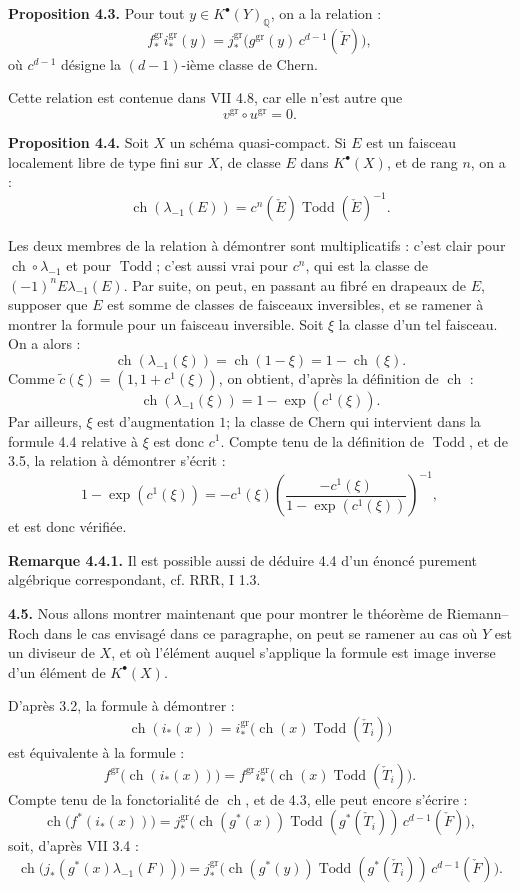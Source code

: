 \documentclass[11pt]{article}
\newcommand{\ch}{\operatorname{ch}}
\newcommand{\Todd}{\operatorname{Todd}}
\newcommand{\RRR}{\mathrm{RRR}}
\providecommand{\ch}{\operatorname{ch}}
\providecommand{\Todd}{\operatorname{Todd}}
\begin{document}
\textbf{Proposition 4.3.} Pour tout \(y\in K^{\bullet}(Y)_{\mathbb Q}\), on a la relation :
\[
 f^{\mathrm{gr}}_* i^{\mathrm{gr}}_*(y)
 =
 j^{\mathrm{gr}}_*\bigl(g^{\mathrm{gr}}(y)\,c^{d-1}(\check F)\bigr),
\]
où \(c^{d-1}\) désigne la \((d-1)\)-ième classe de Chern.

Cette relation est contenue dans VII 4.8, car elle n'est autre que
\[
 v^{\mathrm{gr}}\circ u^{\mathrm{gr}}=0 .
\]

\textbf{Proposition 4.4.} Soit \(X\) un schéma quasi-compact. Si \(E\) est un faisceau localement libre de type fini sur \(X\), de classe \(E\) dans \(K^{\bullet}(X)\), et de rang \(n\), on a :
\[
 \ch(\lambda_{-1}(E))=c^n(\check E)\Todd(\check E)^{-1}.
\]

Les deux membres de la relation à démontrer sont multiplicatifs : c'est clair pour \(\ch\circ\lambda_{-1}\) et pour \(\Todd\); c'est aussi vrai pour \(c^n\), qui est la classe de \((-1)^nE\lambda_{-1}(E)\). Par suite, on peut, en passant au fibré en drapeaux de \(E\), supposer que \(E\) est somme de classes de faisceaux inversibles, et se ramener à montrer la formule pour un faisceau inversible. Soit \(\xi\) la classe d'un tel faisceau. On a alors :
\[
 \ch(\lambda_{-1}(\xi))=\ch(1-\xi)=1-\ch(\xi).
\]
Comme \(\widetilde c(\xi)=(1,1+c^1(\xi))\), on obtient, d'après la définition de \(\ch\) :
\[
 \ch(\lambda_{-1}(\xi))=1-\exp(c^1(\xi)).
\]
Par ailleurs, \(\xi\) est d'augmentation \(1\); la classe de Chern qui intervient dans la formule 4.4 relative à \(\xi\) est donc \(c^1\). Compte tenu de la définition de \(\Todd\), et de 3.5, la relation à démontrer s'écrit :
\[
 1-\exp(c^1(\xi))
 =
 -c^1(\xi)\left(\frac{-c^1(\xi)}{1-\exp(c^1(\xi))}\right)^{-1},
\]
et est donc vérifiée.

\textbf{Remarque 4.4.1.} Il est possible aussi de déduire 4.4 d'un énoncé purement algébrique correspondant, cf. \(\RRR\), I 1.3.

\textbf{4.5.} Nous allons montrer maintenant que pour montrer le théorème de Riemann--Roch dans le cas envisagé dans ce paragraphe, on peut se ramener au cas où \(Y\) est un diviseur de \(X\), et où l'élément auquel s'applique la formule est image inverse d'un élément de \(K^{\bullet}(X)\).

D'après 3.2, la formule à démontrer :
\[
 \ch(i_*(x))=
 i^{\mathrm{gr}}_*\bigl(\ch(x)\Todd(\check T_i)\bigr)
\]
est équivalente à la formule :
\[
 f^{\mathrm{gr}}\bigl(\ch(i_*(x))\bigr)
 =
 f^{\mathrm{gr}}i^{\mathrm{gr}}_*\bigl(\ch(x)\Todd(\check T_i)\bigr).
\]
Compte tenu de la fonctorialité de \(\ch\), et de 4.3, elle peut encore s'écrire :
\[
 \ch\bigl(f^*(i_*(x))\bigr)
 =
 j^{\mathrm{gr}}_*\bigl(\ch(g^*(x))\Todd(g^*(\check T_i))\,c^{d-1}(\check F)\bigr),
\]
soit, d'après VII 3.4 :
\[
 \ch\bigl(j_*(g^*(x)\lambda_{-1}(F))\bigr)
 =
 j^{\mathrm{gr}}_*\bigl(\ch(g^*(y))\Todd(g^*(\check T_i))\,c^{d-1}(\check F)\bigr).
\]
\end{document}

